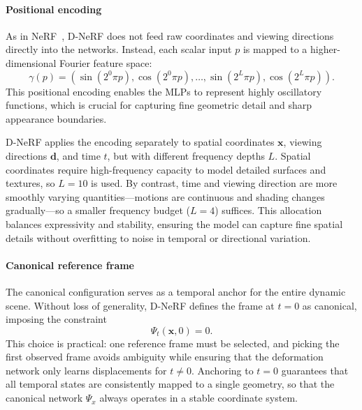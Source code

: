 \begin{enrichment}
\begin{enrichment}
    \newpage
    
    \paragraph{Positional encoding}
    \noindent
    As in NeRF~\cite{mildenhall2020_nerf}, D-NeRF does not feed raw coordinates and viewing directions directly into the networks.
    Instead, each scalar input $p$ is mapped to a higher-dimensional Fourier feature space:
    \[
    \gamma(p) = \left( \sin(2^0 \pi p), \cos(2^0 \pi p), \ldots, \sin(2^L \pi p), \cos(2^L \pi p) \right).
    \]
    This positional encoding enables the MLPs to represent highly oscillatory functions, which is crucial for capturing fine geometric detail and sharp appearance boundaries.
    
    D-NeRF applies the encoding separately to spatial coordinates $\mathbf{x}$, viewing directions $\mathbf{d}$, and time $t$, but with different frequency depths $L$.
    Spatial coordinates require high-frequency capacity to model detailed surfaces and textures, so $L=10$ is used.
    By contrast, time and viewing direction are more smoothly varying quantities—motions are continuous and shading changes gradually—so a smaller frequency budget ($L=4$) suffices.
    This allocation balances expressivity and stability, ensuring the model can capture fine spatial details without overfitting to noise in temporal or directional variation.
    
    \paragraph{Canonical reference frame}
    \noindent
    The canonical configuration serves as a temporal anchor for the entire dynamic scene.
    Without loss of generality, D-NeRF defines the frame at $t=0$ as canonical, imposing the constraint
    \[
    \Psi_t(\mathbf{x}, 0) = 0.
    \]
    This choice is practical: one reference frame must be selected, and picking the first observed frame avoids ambiguity while ensuring that the deformation network only learns displacements for $t \neq 0$.
    Anchoring to $t=0$ guarantees that all temporal states are consistently mapped to a single geometry, so that the canonical network $\Psi_x$ always operates in a stable coordinate system.


\end{enrichment}
\end{enrichment}
